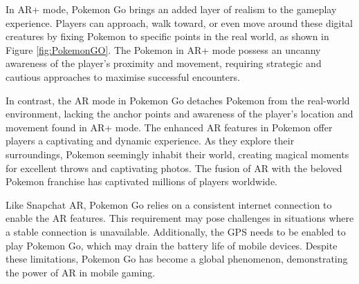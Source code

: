 In \ac{AR}+ mode, Pokemon Go brings an added layer of realism to the gameplay experience. Players can approach, walk toward, or even move around these digital creatures by fixing Pokemon to specific points in the real world, as shown in Figure \ref*{fig:PokemonGO}. The Pokemon in \ac{AR}+ mode possess an uncanny awareness of the player's proximity and movement, requiring strategic and cautious approaches to maximise successful encounters.

In contrast, the \ac{AR} mode in Pokemon Go detaches Pokemon from the real-world environment, lacking the anchor points and awareness of the player's location and movement found in AR+ mode.
The enhanced \ac{AR} features in Pokemon offer players a captivating and dynamic experience. As they explore their surroundings, Pokemon seemingly inhabit their world, creating magical moments for excellent throws and captivating photos. The fusion of \ac{AR} with the beloved Pokemon franchise has captivated millions of players worldwide.

Like Snapchat AR, Pokemon Go relies on a consistent internet connection to enable the \ac{AR} features. This requirement may pose challenges in situations where a stable connection is unavailable. Additionally, the GPS needs to be enabled to play Pokemon Go, which may drain the battery life of mobile devices. Despite these limitations, Pokemon Go has become a global phenomenon, demonstrating the power of \ac{AR} in mobile gaming.